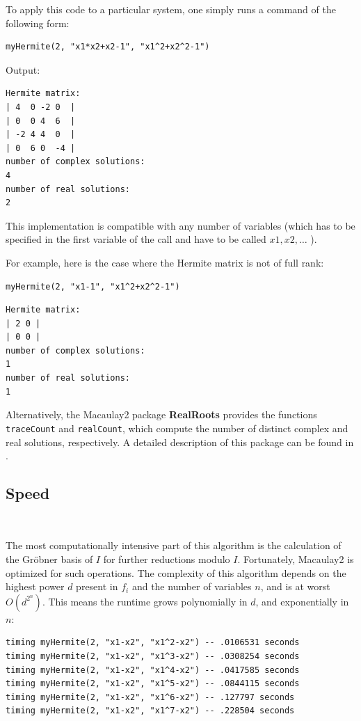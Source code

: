 \documentclass{amsart}
\begin{document}
To apply this code to a particular system, one simply runs a command of the following form:
\begin{lstlisting}[language = Macaulay2]
myHermite(2, "x1*x2+x2-1", "x1^2+x2^2-1")
\end{lstlisting}

\noindent Output:
\begin{lstlisting}
Hermite matrix:
| 4  0 -2 0  |
| 0  0 4  6  |
| -2 4 4  0  |
| 0  6 0  -4 |
number of complex solutions:
4
number of real solutions:
2
\end{lstlisting}

This implementation is compatible with any number of variables (which has to be specified in the first variable of the call and have to be called \( x1, x2, \ldots \) ).

For example, here is the case where the Hermite matrix is not of full rank:
\begin{lstlisting}[language = Macaulay2]
myHermite(2, "x1-1", "x1^2+x2^2-1")
\end{lstlisting}
\begin{lstlisting}[language = Macaulay2]
Hermite matrix:
| 2 0 |
| 0 0 |
number of complex solutions:
1
number of real solutions:
1
\end{lstlisting}

Alternatively, the Macaulay2 package \textbf{RealRoots} provides the functions \texttt{traceCount} and \texttt{realCount}, which compute the number of distinct complex and real solutions, respectively. A detailed description of this package can be found in \cite{garcia_maluccio_sottile_yahl2024article}.

\vspace{1em}

\subsection{Speed}~

The most computationally intensive part of this algorithm is the calculation of the Gröbner basis of $I$ for further reductions modulo $I$. Fortunately, Macaulay2 is optimized for such operations. The complexity of this algorithm depends on the highest power $d$ present in $f_i$ and the number of variables $n$, and is at worst $O(d^{2^n})$. This means the runtime grows polynomially in $d$, and exponentially in $n$:

\begin{lstlisting}[language = Macaulay2]
timing myHermite(2, "x1-x2", "x1^2-x2") -- .0106531 seconds
timing myHermite(2, "x1-x2", "x1^3-x2") -- .0308254 seconds
timing myHermite(2, "x1-x2", "x1^4-x2") -- .0417585 seconds
timing myHermite(2, "x1-x2", "x1^5-x2") -- .0844115 seconds
timing myHermite(2, "x1-x2", "x1^6-x2") -- .127797 seconds
timing myHermite(2, "x1-x2", "x1^7-x2") -- .228504 seconds
\end{lstlisting}
\end{document}
